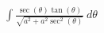 \documentclass[preview]{standalone}
\begin{document}
\begin{align*}
\int \frac{\sec(\theta)\tan(\theta)}{\sqrt{a^2+a^2 \sec^2(\theta)}} \ d\theta
\end{align*}
\end{document}
